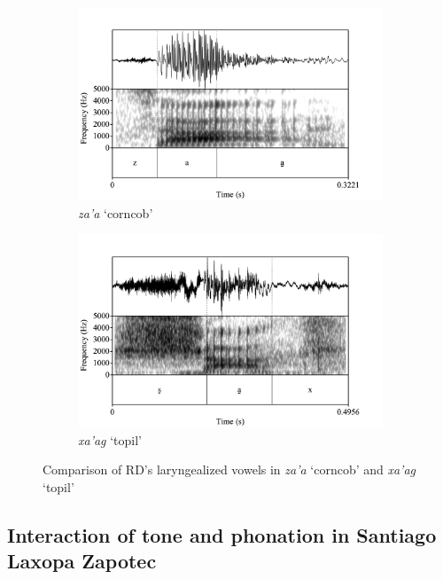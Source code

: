 \documentclass[12pt, letterpaper]{article}
\begin{document}
\begin{figure}[!h]
	\centering
	\begin{subfigure}{.5\textwidth}
		\centering
		\includegraphics[width=\linewidth]{../RD_za'a.png}
		\caption{\textit{za'a} `corncob'}
		\label{fig:za'a}
	\end{subfigure}%
	\begin{subfigure}{.5\textwidth}
		\centering
		\includegraphics[width=\linewidth]{../RD_xa'ag.png}
		\caption{\textit{xa'ag} `topil'}
		\label{fig:xa'ag}
	\end{subfigure}
	\caption{Comparison of RD's laryngealized vowels in \textit{za'a} `corncob' and \textit{xa'ag} `topil'}
	\label{fig:RDLaryngeal}
\end{figure}

\subsection{Interaction of tone and phonation in Santiago Laxopa Zapotec} \label{sec:TonePhonation}
\end{document}
